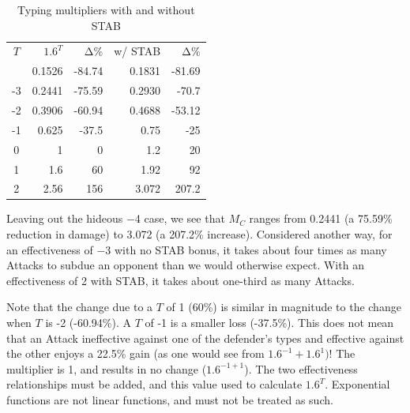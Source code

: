 \begin{table}
\begin{center}
\begin{tabular}{c r r r r}
  $T$ & $1.6^{T}$ & Δ\% & w/ STAB & Δ\% \\
\Midrule
  -4 & 0.1526 & -84.74 & 0.1831 & -81.69 \\
  -3 & 0.2441 & -75.59 & 0.2930 & -70.7 \\
  -2 & 0.3906 & -60.94 & 0.4688 & -53.12 \\
  -1 & 0.625 & -37.5 & 0.75 & -25 \\
  0 & 1 & 0 & 1.2 & 20 \\
  1 & 1.6 & 60 & 1.92 & 92 \\
  2 & 2.56 & 156 & 3.072 & 207.2 \\
\end{tabular}
\caption{Typing multipliers with and without STAB}
\label{table:typemult}
\end{center}
\end{table}

Leaving out the hideous −4 case, we see that $M_C$ ranges
 from 0.2441 (a 75.59\% reduction in damage) to 3.072
 (a 207.2\% increase).
Considered another way, for an effectiveness of −3 with no STAB bonus,
 it takes about four times as many Attacks to subdue an opponent than
 we would otherwise expect.
With an effectiveness of 2 with STAB, it takes about one-third as many Attacks.

Note that the change due to a $T$ of 1 (60\%) is similar in magnitude to the change
 when $T$ is -2 (-60.94\%). A $T$ of -1 is a smaller loss (-37.5\%).
This does not mean that an Attack ineffective against one of the defender's types and
 effective against the other enjoys a 22.5\% gain (as one would see from $1.6^{-1} + 1.6^{1})$!
The multiplier is 1, and results in no change ($1.6^{-1+1}$).
The two effectiveness relationships must be added, and this value used to
 calculate $1.6^T$.
Exponential functions are not linear functions, and must not be treated as such.

